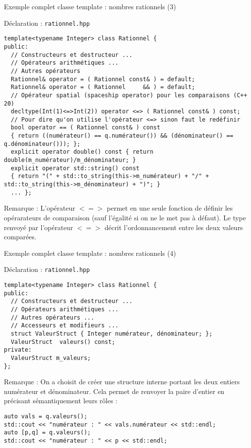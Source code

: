 \documentclass[compress,10pt,aspectratio=169]{beamer}
\begin{document}
\begin{frame}[fragile]{Exemple complet classe template : nombres rationnels (3)}
\scriptsize\vspace*{-5mm}
\begin{block}{\small Déclaration : \texttt{rationnel.hpp}}
\begin{verbatim}
template<typename Integer> class Rationnel {
public:
  // Constructeurs et destructeur ...
  // Opérateurs arithmétiques ...
  // Autres opérateurs
  Rationnel& operator = ( Rationnel const& ) = default;
  Rationnel& operator = ( Rationnel     && ) = default;
  // Opérateur spatial (spaceship operator) pour les comparaisons (C++ 20)
  decltype(Int(1)<=>Int(2)) operator <=> ( Rationnel const& ) const;
  // Pour dire qu'on utilise l'opérateur <=> sinon faut le redéfinir
  bool operator == ( Rationnel const& ) const 
  { return ((numérateur() == q.numérateur()) && (dénominateur() == q.dénominateur())); };
  explicit operator double() const { return double(m_numérateur)/m_dénominateur; }
  explicit operator std::string() const 
  { return "(" + std::to_string(this->m_numérateur) + "/" + std::to_string(this->m_dénominateur) + ")"; }
  ... };
\end{verbatim}
\end{block}
\vspace*{-3mm}
\alert{Remarque} : L'opérateur $<=>$ permet en une seule fonction de définir les 
opérarateurs de comparaison (sauf l'égalité si on ne le met pas à défaut). Le type 
renvoyé par l'opérateur $<=>$ décrit l'ordonnancement entre les deux valeurs comparées.
\end{frame}

\begin{frame}[fragile]{Exemple complet classe template : nombres rationnels (4)}
\scriptsize\vspace*{-5mm}
\begin{block}{\small Déclaration : \texttt{rationnel.hpp}}
  \begin{verbatim}
template<typename Integer> class Rationnel {
public:
  // Constructeurs et destructeur ...
  // Opérateurs arithmétiques ...
  // Autres opérateurs ...
  // Accesseurs et modifieurs ... 
  struct ValeurStruct { Integer numérateur, dénominateur; };
  ValeurStruct  valeurs() const;
private:
  ValeurStruct m_valeurs;
};
\end{verbatim}
\end{block}
\alert{Remarque} : On a choisit de créer une structure interne portant les deux 
entiers numérateur et dénominateur. Cela permet de renvoyer la paire d'entier en
précisant sémantiquement leurs rôles :
\begin{verbatim}
auto vals = q.valeurs();
std::cout << "numérateur : " << vals.numérateur << std::endl;
auto [p,q] = q.valeurs(); 
std::cout << "numérateur : " << p << std::endl;
\end{verbatim}
\end{frame}
\end{document}
